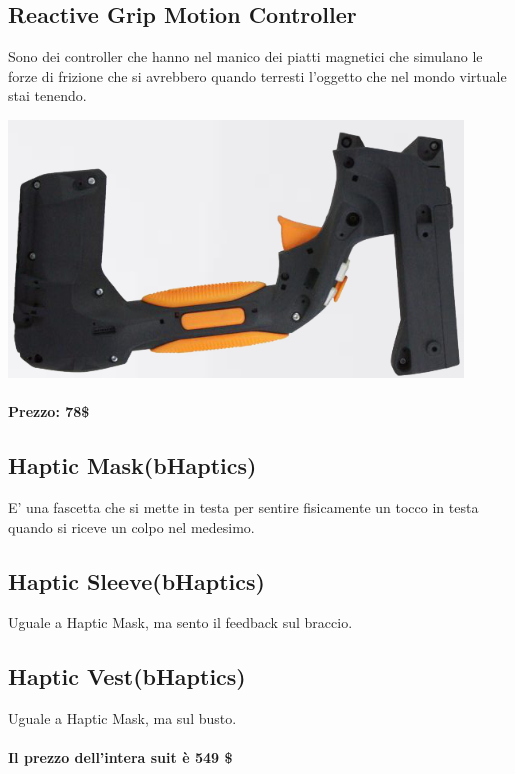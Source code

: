 \documentclass[8pt]{extarticle}
\begin{document}
\begin{multicols}{3}
\subsection{Reactive Grip Motion Controller}
Sono dei controller che hanno nel manico dei piatti magnetici che simulano le forze di frizione che si avrebbero quando terresti l'oggetto che nel mondo virtuale stai tenendo.
\begin{center}
    \begin{minipage}{\columnwidth}
        \includegraphics[width=\columnwidth]{reactiveGrip.png}
    \end{minipage}
\end{center}
\paragraph{Prezzo: 78\$}
\subsection{Haptic Mask(bHaptics)}
E' una fascetta che si mette in testa per sentire fisicamente un tocco in testa quando si riceve un colpo nel medesimo.
\subsection{Haptic Sleeve(bHaptics)}
Uguale a Haptic Mask, ma sento il feedback sul braccio.
\subsection{Haptic Vest(bHaptics)}
Uguale a Haptic Mask, ma sul busto.
\paragraph{Il prezzo dell'intera suit è 549 \$} 

\end{multicols}
\end{document}
